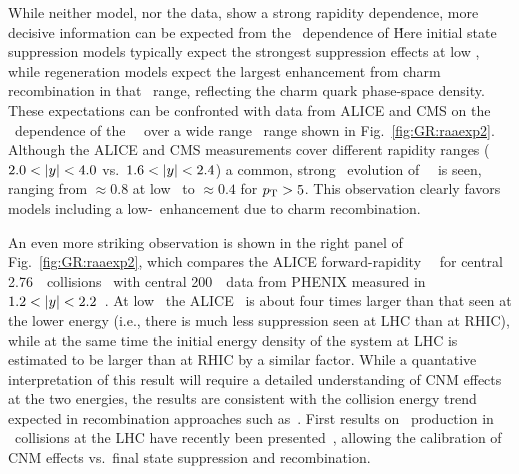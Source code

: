 While neither model, nor the data, show a strong rapidity dependence, more decisive 
information can be expected from the \pT\ dependence of \Raa\. Here initial state 
suppression models typically expect the strongest suppression effects at low \pT, while 
regeneration models expect the largest enhancement from charm recombination in that \pT\ range,
reflecting the charm quark phase-space density.
These expectations can be confronted with data from ALICE and CMS on the \pT\ dependence of the 
\jpsi\ \Raa\ over a wide range \pT\ range shown in Fig.~\ref{fig:GR:raaexp2}. 
Although the ALICE and CMS measurements cover different rapidity ranges ($2.0 < |y| < 4.0$ vs.\ $ 1.6  < |y| < 2.4 $)
a common, strong \pT\ evolution of \jpsi\ \Raa\ is seen, ranging from $\approx 0.8$ 
at low \pT\ to $\approx 0.4$ for $\mbox{$p_{\mathrm{T}}$} > 5$\GeVc.
This observation clearly favors models including a low-\pT\ enhancement due to charm recombination.

An even more striking observation is shown in the right panel of Fig.~\ref{fig:GR:raaexp2}, which compares
the ALICE forward-rapidity \jpsi\ \Raa\ for central 2.76\TeV\ \PbPb\ collisions~\cite{Abelev:2013ila}
with central 200\GeV\ \AuAu\ data from PHENIX measured in $1.2 < |y| < 2.2$~\cite{Adare:2011yf}.
At low \pT\ the ALICE \Raa\ is about four times larger than that seen at the lower energy (i.e.,
there is much less suppression seen at LHC than at RHIC), while
at the same time the initial energy density of the system at LHC is estimated to be larger than at
RHIC by a similar factor. While a quantative interpretation of this result will require
a detailed understanding of CNM effects at the two energies, the results are  consistent
with the collision energy trend expected in recombination approaches such as~\cite{Zhao:2007hh,Zhou:2013aea,Liu:2009nb}.
First results on \jpsi\ production in \pPb\ collisions at the LHC have recently
been presented~\cite{Abelev:2013yxa,Aaij:2013zxa}, allowing
the calibration of CNM effects vs.\ final state suppression and recombination.

